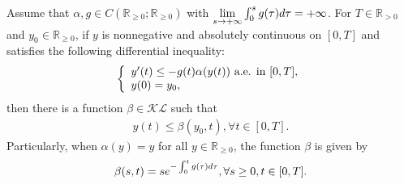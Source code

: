 \documentclass[10pt,a4paper]{amsart}
\begin{document}
\begin{lemma}\label{lemma 2.1}
	Assume that $\alpha,g  \in C(\mathbb{R}_{\geq 0};\mathbb{R}_{\geq 0})$  with $\lim\limits_{s\rightarrow +\infty}\int_{0}^sg(\tau) {\rm{d}}\tau=+\infty$.
	For $T\in \mathbb{R}_{>0}$ and $y_0\in \mathbb{R}_{\geq 0}$, if $y$ is   nonnegative and absolutely continuous   on $[0,T]$  and satisfies the following differential inequality:
	\begin{equation}\label{ODE}
		\left\{
		\begin{array}{ll}
			y'(t)\leq -g(t)\alpha(y(t))  \  \text{a.e. in}\  [0,T],\\
			y(0)=y_0,
		\end{array}\\
		\right.
	\end{equation}
	then there is a function $\beta \in\mathcal{K}\mathcal{L}$ such that
	\begin{align*}
		y(t)\leq \beta (y_0,t), \forall t\in [0,T].
	\end{align*}
	Particularly, when $ \alpha(y)=y$ for all $y\in \mathbb{R}_{\geq 0}$,
	the function $\beta$ is given by
	\begin{align*}
		\beta (s,t)=se^{-\int_{0}^tg (\tau){\rm d}\tau},\forall s\geq 0,t\in[0,T].
	\end{align*}
\end{lemma}
\end{document}
